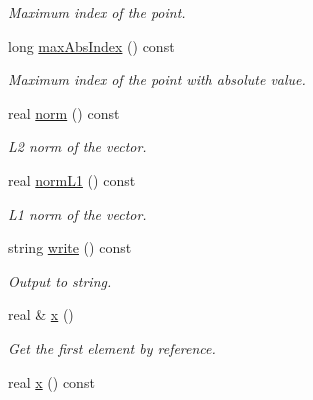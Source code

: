 \begin{DoxyCompactItemize}
\begin{DoxyCompactList}\small\item\em Maximum index of the point. \end{DoxyCompactList}\item 
long \hyperlink{class_point_a5b06a3b1249d1a29e316b00e94522a5a}{max\+Abs\+Index} () const \hypertarget{class_point_a5b06a3b1249d1a29e316b00e94522a5a}{}\label{class_point_a5b06a3b1249d1a29e316b00e94522a5a}

\begin{DoxyCompactList}\small\item\em Maximum index of the point with absolute value. \end{DoxyCompactList}\item 
real \hyperlink{class_point_a885ede7e456888ddb73792df46f88513}{norm} () const \hypertarget{class_point_a885ede7e456888ddb73792df46f88513}{}\label{class_point_a885ede7e456888ddb73792df46f88513}

\begin{DoxyCompactList}\small\item\em L2 norm of the vector. \end{DoxyCompactList}\item 
real \hyperlink{class_point_a6a5c8172bed4fadd3ff4369ac24b627e}{norm\+L1} () const \hypertarget{class_point_a6a5c8172bed4fadd3ff4369ac24b627e}{}\label{class_point_a6a5c8172bed4fadd3ff4369ac24b627e}

\begin{DoxyCompactList}\small\item\em L1 norm of the vector. \end{DoxyCompactList}\item 
string \hyperlink{class_point_a2e471acd2e526217306b148ef5d04d87}{write} () const 
\begin{DoxyCompactList}\small\item\em Output to string. \end{DoxyCompactList}\item 
real \& \hyperlink{class_point_ad9c36be87662ac8b290800ff76b8a3f7}{x} ()\hypertarget{class_point_ad9c36be87662ac8b290800ff76b8a3f7}{}\label{class_point_ad9c36be87662ac8b290800ff76b8a3f7}

\begin{DoxyCompactList}\small\item\em Get the first element by reference. \end{DoxyCompactList}\item 
real \hyperlink{class_point_a155238f2303c1805a976e5ffde2df863}{x} () const \hypertarget{class_point_a155238f2303c1805a976e5ffde2df863}{}\label{class_point_a155238f2303c1805a976e5ffde2df863}


\end{DoxyCompactItemize}
